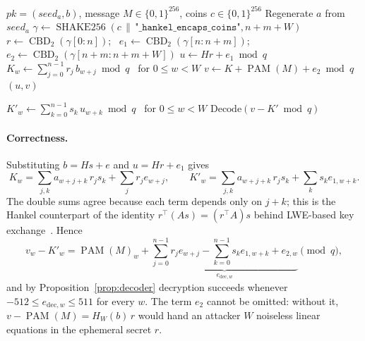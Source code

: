 \documentclass[11pt,a4paper]{article}
\theoremstyle{definition}
\newcommand{\CBD}{\operatorname{CBD}}
\newcommand{\SHAKE}{\operatorname{SHAKE256}}
\newcommand{\PAM}{\operatorname{PAM}}
\begin{document}
\begin{algorithm}[H]
\caption{$\mathsf{CPA.Enc}(\mathit{pk}, M; c)$}\label{alg:cpa_enc}
\begin{algorithmic}[1]
\Require $\mathit{pk} = (\mathit{seed}_a, b)$, message $M \in \{0,1\}^{256}$, coins $c \in \{0,1\}^{256}$
\State Regenerate $a$ from $\mathit{seed}_a$
\State $\gamma \gets \SHAKE(c \,\|\, \texttt{"\_hankel\_encaps\_coins"}, n + m + W)$
\State $r \gets \CBD_2(\gamma[0{:}n])$; \ $e_1 \gets \CBD_2(\gamma[n{:}n+m])$; \ $e_2 \gets \CBD_2(\gamma[n+m{:}n+m+W])$
\State $u \gets H r + e_1 \bmod q$
\State $K_w \gets \sum_{j=0}^{n-1} r_j\, b_{w+j} \bmod q$ \ for $0 \le w < W$ 
\State $v \gets K + \PAM(M) + e_2 \bmod q$
\State \Return $(u, v)$
\end{algorithmic}
\end{algorithm}

\begin{algorithm}[H]
\caption{$\mathsf{CPA.Dec}(s, (u, v))$}\label{alg:cpa_dec}
\begin{algorithmic}[1]
\State $K'_w \gets \sum_{k=0}^{n-1} s_k\, u_{w+k} \bmod q$ \ for $0 \le w < W$ 
\State \Return $\mathrm{Decode}(v - K' \bmod q)$ 
\end{algorithmic}
\end{algorithm}

\paragraph{Correctness.} Substituting $b = Hs + e$ and $u = Hr + e_1$ gives
\[
K_w = \sum_{j,k} a_{w+j+k}\, r_j s_k + \sum_j r_j e_{w+j},
\qquad
K'_w = \sum_{j,k} a_{w+j+k}\, r_j s_k + \sum_k s_k e_{1,w+k}.
\]
The double sums agree because each term depends only on $j + k$; this is the Hankel counterpart of the identity $r^{\top}(As) = (r^{\top}A)s$ behind LWE-based key exchange~\cite{lindner2011better}. Hence
\[
v_w - K'_w = \PAM(M)_w + \underbrace{\sum_{j=0}^{n-1} r_j e_{w+j} - \sum_{k=0}^{n-1} s_k e_{1,w+k} + e_{2,w}}_{e_{\mathrm{dec},w}} \pmod q,
\]
and by Proposition~\ref{prop:decoder} decryption succeeds whenever $-512 \le e_{\mathrm{dec},w} \le 511$ for every $w$. The term $e_2$ cannot be omitted: without it, $v - \PAM(M) = H_W(b)\,r$ would hand an attacker $W$ noiseless linear equations in the ephemeral secret $r$.
\end{document}
